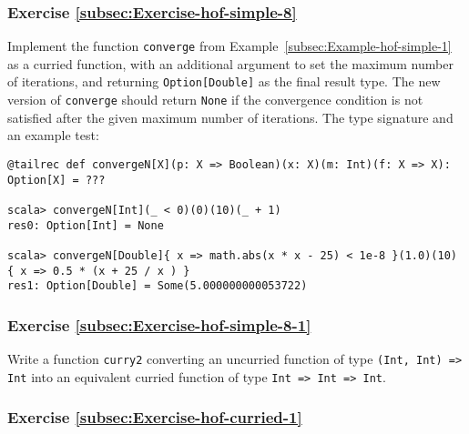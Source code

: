 \subsubsection{Exercise \label{subsec:Exercise-hof-simple-8}\ref{subsec:Exercise-hof-simple-8}}

Implement the function \lstinline!converge! from Example~\ref{subsec:Example-hof-simple-1}
as a curried function, with an additional argument to set the maximum
number of iterations, and returning \lstinline!Option[Double]! as
the final result type. The new version of \lstinline!converge! should
return \lstinline!None! if the convergence condition is not satisfied
after the given maximum number of iterations. The type signature and
an example test:
\begin{lstlisting}
@tailrec def convergeN[X](p: X => Boolean)(x: X)(m: Int)(f: X => X): Option[X] = ???

scala> convergeN[Int](_ < 0)(0)(10)(_ + 1)
res0: Option[Int] = None

scala> convergeN[Double]{ x => math.abs(x * x - 25) < 1e-8 }(1.0)(10) { x => 0.5 * (x + 25 / x ) }
res1: Option[Double] = Some(5.000000000053722)
\end{lstlisting}
\begin{comment}
Solution:
\begin{lstlisting}
def convergeN[X](p: X => Boolean)(x:X)(m:Int)(f: X => X): Option[X] =  {
              if (m <= 0) None
              else if (p(x)) Some(x) else converge(p)(f(x))(m-1)(f)             } // Defining as def convergeN[X]: (X => Boolean) => X => Int => (X => X) => Option[X] = ??? will break tail recursion!
\end{lstlisting}
\end{comment}


\subsubsection{Exercise \label{subsec:Exercise-hof-simple-8-1}\ref{subsec:Exercise-hof-simple-8-1}}

Write a function \lstinline!curry2! converting an uncurried function
of type \texttt{}\lstinline!(Int, Int) => Int! into an equivalent
curried function of type \texttt{}\lstinline!Int => Int => Int!.

\subsubsection{Exercise \label{subsec:Exercise-hof-curried-1}\ref{subsec:Exercise-hof-curried-1}}

